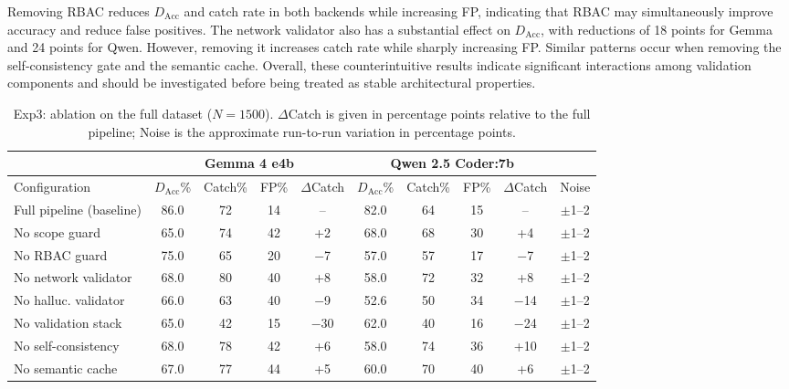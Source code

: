 \documentclass[a4paper,twoside]{article}
\begin{document}
Removing RBAC reduces $D_{\mathrm{Acc}}$ and catch rate in both backends while increasing FP, indicating that RBAC may simultaneously improve accuracy and reduce false positives. The network validator also has a substantial effect on $D_{\mathrm{Acc}}$, with reductions of 18 points for Gemma and 24 points for Qwen. However, removing it increases catch rate while sharply increasing FP. Similar patterns occur when removing the self-consistency gate and the semantic cache. Overall, these counterintuitive results indicate significant interactions among validation components and should be investigated before being treated as stable architectural properties.

\begin{table}[t]
\caption{Exp3: ablation on the full dataset ($N = 1500$). $\Delta$Catch is given in percentage points relative to the full pipeline; Noise is the approximate run-to-run variation in percentage points.}\label{tab:ablation}
\centering
\small
\begin{tabular}{|l|c|c|c|c|c|c|c|c|c|}
  \hline
   & \multicolumn{4}{c|}{Gemma 4 e4b} & \multicolumn{4}{c|}{Qwen 2.5 Coder:7b} & \\
  \hline
  Configuration & $D_{\mathrm{Acc}}$\% & Catch\% & FP\% & $\Delta$Catch & $D_{\mathrm{Acc}}$\% & Catch\% & FP\% & $\Delta$Catch & Noise \\
  \hline
  Full pipeline (baseline) & 86.0 & 72 & 14 & --  & 82.0 & 64 & 15 & --  & $\pm$1--2 \\
  No scope guard           & 65.0 & 74 & 42 & +2  & 68.0 & 68 & 30 & +4  & $\pm$1--2 \\
  No RBAC guard            & 75.0 & 65 & 20 & $-$7  & 57.0 & 57 & 17 & $-$7  & $\pm$1--2 \\
  No network validator     & 68.0 & 80 & 40 & +8  & 58.0 & 72 & 32 & +8  & $\pm$1--2 \\
  No halluc. validator     & 66.0 & 63 & 40 & $-$9  & 52.6 & 50 & 34 & $-$14 & $\pm$1--2 \\
  No validation stack      & 65.0 & 42 & 15 & $-$30 & 62.0 & 40 & 16 & $-$24 & $\pm$1--2 \\
  No self-consistency      & 68.0 & 78 & 42 & +6  & 58.0 & 74 & 36 & +10 & $\pm$1--2 \\
  No semantic cache        & 67.0 & 77 & 44 & +5  & 60.0 & 70 & 40 & +6  & $\pm$1--2 \\
  \hline
\end{tabular}
\end{table}
\end{document}
